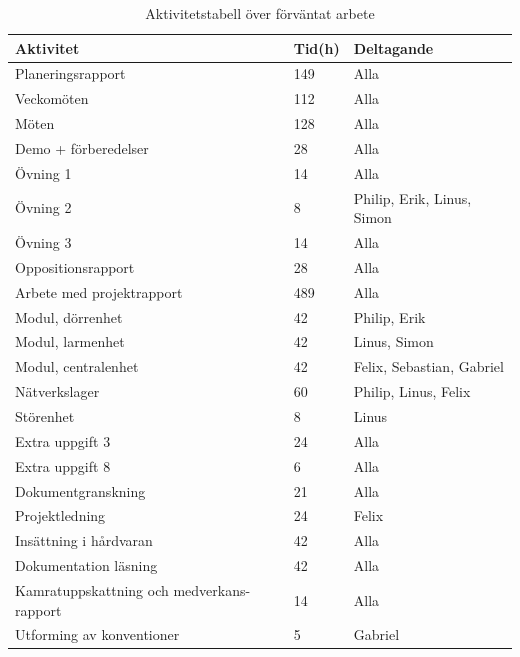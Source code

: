 \documentclass[a4paper]{article}
\begin{document}
\begin{table}[h]
    \centering
    \begin{tabular}{l|l|l}
         Aktivitet & Tid(h) & Deltagande \\
         \hline
         Planeringsrapport & 149 & Alla \\
         Veckomöten & 112 & Alla \\
         Möten & 128 & Alla\\
         Demo + förberedelser & 28 & Alla \\
         Övning 1 & 14 & Alla \\
         Övning 2& 8 & Philip, Erik, Linus, Simon \\
         Övning 3& 14 & Alla \\
         Oppositionsrapport & 28 & Alla \\
         Arbete med projektrapport & 489 & Alla \\
         Modul, dörrenhet & 42 & Philip, Erik \\
         Modul, larmenhet & 42 & Linus, Simon \\
         Modul, centralenhet & 42 & Felix, Sebastian, Gabriel \\
         Nätverkslager & 60 & Philip, Linus, Felix  \\
         Störenhet & 8 & Linus \\
         Extra uppgift 3 & 24 & Alla \\
         Extra uppgift 8 & 6 & Alla\\
         Dokumentgranskning& 21 & Alla \\
         Projektledning &  24 & Felix \\
         Insättning i hårdvaran & 42 & Alla \\
         Dokumentation läsning & 42 & Alla\\
         Kamratuppskattning och medverkans-rapport & 14 & Alla\\
         Utforming av konventioner & 5 & Gabriel\\
         \hline
    \end{tabular}
    \caption{Aktivitetstabell över förväntat arbete}
    \label{tab:aktiviteter}
\end{table}

\end{document}
